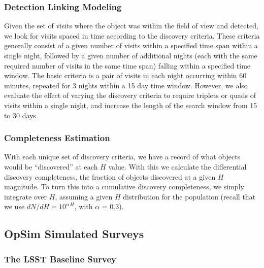 \subsubsection{Detection Linking Modeling} 

Given the set of visits where the object was within the field of view and detected, we look for visits spaced in time 
according to the discovery criteria. These criteria generally consist of a given number of visits within a specified 
time span within a single night, followed by a given number of additional nights (each with the same required number 
of visits in the same time span) falling within a specified time window. The basic criteria is a pair of visits in each 
night occurring within 60 minutes, repeated for 3 nights within a 15 day time window. However, we also evaluate 
the effect of varying the discovery criteria to require triplets or quads of visits within a single night, and increase 
the length of the search window from 15 to 30 days.


\subsubsection{Completeness Estimation} 

With each unique set of discovery criteria, we have a record of what objects would be ``discovered'' at each $H$ value. 
With this we calculate the differential discovery completeness, the fraction of objects discovered at a given $H$ magnitude. 
To turn this into a cumulative discovery completeness, we simply integrate over $H$, assuming a given $H$ distribution 
for the population (recall that we use $dN/dH = 10^{\alpha\, H}$, with $\alpha$ = 0.3).


\subsection{OpSim Simulated Surveys \label{sec:surveys}}

\subsubsection{The LSST Baseline Survey} 

